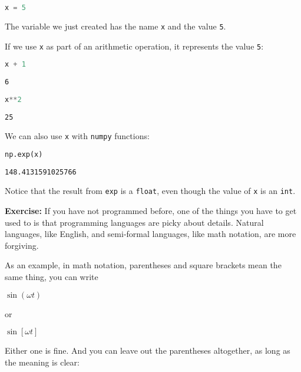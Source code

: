 \begin{lstlisting}[language=Python]
x = 5
\end{lstlisting}

The variable we just created has the name \passthrough{\lstinline!x!}
and the value \passthrough{\lstinline!5!}.

If we use \passthrough{\lstinline!x!} as part of an arithmetic
operation, it represents the value \passthrough{\lstinline!5!}:

\begin{lstlisting}[language=Python]
x + 1
\end{lstlisting}

\begin{lstlisting}[]
6
\end{lstlisting}

\begin{lstlisting}[language=Python]
x**2
\end{lstlisting}

\begin{lstlisting}[]
25
\end{lstlisting}

We can also use \passthrough{\lstinline!x!} with
\passthrough{\lstinline!numpy!} functions:

\begin{lstlisting}[language=Python]
np.exp(x)
\end{lstlisting}

\begin{lstlisting}[]
148.4131591025766
\end{lstlisting}

Notice that the result from \passthrough{\lstinline!exp!} is a
\passthrough{\lstinline!float!}, even though the value of
\passthrough{\lstinline!x!} is an \passthrough{\lstinline!int!}.

\textbf{Exercise:} If you have not programmed before, one of the things
you have to get used to is that programming languages are picky about
details. Natural languages, like English, and semi-formal languages,
like math notation, are more forgiving.

As an example, in math notation, parentheses and square brackets mean
the same thing, you can write

\(\sin (\omega t)\)

or

\(\sin [\omega t]\)

Either one is fine. And you can leave out the parentheses altogether, as
long as the meaning is clear:

